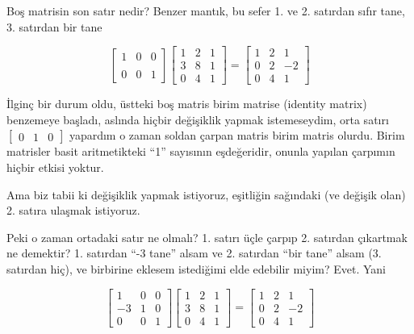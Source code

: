 \documentclass[12pt,fleqn]{article}\usepackage{../../common}
\begin{document}
Boş matrisin son satır nedir? Benzer mantık, bu sefer 1. ve 2. satırdan
sıfır tane, 3. satırdan bir tane


$$ 
\left[\begin{array}{rrr}
1 & 0 & 0 \\
 &  &  \\
0 & 0 & 1
\end{array}\right]
\left[\begin{array}{rrr}
1 & 2 & 1 \\
3 & 8 & 1 \\
0 & 4 & 1
\end{array}\right] =
\left[\begin{array}{rrr}
    1 & 2 & 1 \\
    0 & 2 & -2 \\
    0 & 4 & 1
  \end{array}\right]
 $$

İlginç bir durum oldu, üstteki boş matris birim matrise (identity matrix)
benzemeye başladı, aslında hiçbir değişiklik yapmak istemeseydim, orta
satırı $\left[\begin{array}{rrr}0 & 1 & 0 \end{array}\right]$ yapardım 
o zaman soldan çarpan matris birim matris olurdu. Birim matrisler basit 
aritmetikteki ``1'' sayısının eşdeğeridir, onunla yapılan çarpımın 
hiçbir etkisi yoktur.

Ama biz tabii ki değişiklik yapmak istiyoruz, eşitliğin sağındaki (ve
değişik olan) 2. satıra ulaşmak istiyoruz. 

Peki o zaman ortadaki satır ne olmalı? 1. satırı üçle çarpıp 2. satırdan
çıkartmak ne demektir? 1. satırdan ``-3 tane'' alsam ve 2. satırdan ``bir
tane'' alsam (3. satırdan hiç), ve birbirine eklesem istediğimi elde
edebilir miyim? Evet. Yani 

$$ 
\left[\begin{array}{rrr}
1 & 0 & 0 \\
-3 & 1 & 0 \\
0 & 0 & 1
\end{array}\right]
\left[\begin{array}{rrr}
1 & 2 & 1 \\
3 & 8 & 1 \\
0 & 4 & 1
\end{array}\right] =
\left[\begin{array}{rrr}
    1 & 2 & 1 \\
    0 & 2 & -2 \\
    0 & 4 & 1
  \end{array}\right]
 $$
\end{document}
